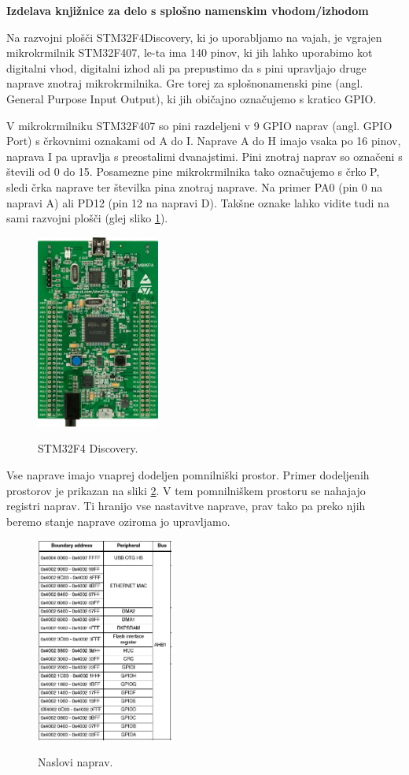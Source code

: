 \documentclass[12pt,letterpaper]{article}
\begin{document}
\begin{center}
    \textbf{\Large Izdelava knjižnice za delo s splošno namenskim vhodom/izhodom}   
\end{center}

Na razvojni plošči STM32F4Discovery, ki jo uporabljamo na vajah, je vgrajen mikrokrmilnik STM32F407, le-ta ima 140 pinov, ki jih lahko uporabimo kot digitalni vhod, digitalni izhod ali pa prepustimo da s pini upravljajo druge naprave znotraj mikrokrmilnika. Gre torej za splošnonamenski pine (angl. General Purpose Input Output), ki jih običajno označujemo s kratico GPIO.

V mikrokrmilniku STM32F407 so pini razdeljeni v 9 GPIO naprav (angl. GPIO Port) s črkovnimi oznakami od A do I. Naprave A do H imajo vsaka po 16 pinov, naprava I pa upravlja s preostalimi dvanajstimi. Pini znotraj naprav so označeni s števili od 0 do 15. Posamezne pine mikrokrmilnika tako označujemo s črko P, sledi črka naprave ter številka pina znotraj naprave. Na primer PA0 (pin 0 na napravi A) ali PD12 (pin 12 na napravi D). Takšne oznake lahko vidite tudi na sami razvojni plošči (glej sliko \ref{smt32f4discovery}).

\begin{figure}[ht!]
  \centering
  \caption{STM32F4 Discovery.}
  \includegraphics[height=180pt]{images/vaja3/stm32f4_discovery.jpg}
  \label{smt32f4discovery}
\end{figure}

Vse naprave imajo vnaprej dodeljen pomnilniški prostor. Primer dodeljenih prostorov je prikazan na sliki \ref{naslovi}. V tem pomnilniškem prostoru se nahajajo registri naprav. Ti hranijo vse nastavitve naprave, prav tako pa preko njih beremo stanje naprave oziroma jo upravljamo.

\begin{figure}[ht!]
  \centering
  \caption{Naslovi naprav.}
  \includegraphics[height=190pt]{images/vaja3/naslovi.png}
  \label{naslovi}
\end{figure}
\end{document}

